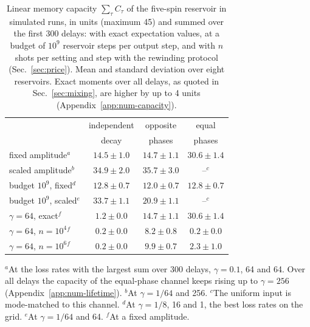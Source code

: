 \begin{table}[!t]
\caption{\label{tab:memory}Linear memory capacity $\sum_\tau C_\tau$ of the five-spin reservoir in simulated runs, in
units (maximum 45) and summed over the first 300 delays: with exact expectation values, at a budget of $10^9$
reservoir steps per output step, and with $n$ shots per setting and step with the rewinding protocol
(Sec.~\ref{sec:price}). Mean and standard deviation over eight reservoirs. Exact moments over all delays, as quoted in
Sec.~\ref{sec:mixing}, are higher by up to 4 units (Appendix~\ref{app:num-capacity}).}
\centering\footnotesize\setlength{\tabcolsep}{3pt}
\begin{tabular}{@{}lccc@{}}
\toprule
 & independent & opposite & equal\\
 & decay & phases & phases\\\midrule
fixed amplitude$^{a}$ & $14.5\pm1.0$ & $14.7\pm1.1$ & $30.6\pm1.4$\\
scaled amplitude$^{b}$ & $34.9\pm2.0$ & $35.7\pm3.0$ & --$^{c}$\\
budget $10^9$, fixed$^{d}$ & $12.8\pm0.7$ & $12.0\pm0.7$ & $12.8\pm0.7$\\
budget $10^9$, scaled$^{e}$ & $33.7\pm1.1$ & $20.9\pm1.1$ & --$^{c}$\\
$\gamma=64$, exact$^{f}$ & $1.2\pm0.0$ & $14.7\pm1.1$ & $30.6\pm1.4$\\
$\gamma=64$, $n=10^4$$^{f}$ & $0.2\pm0.0$ & $8.2\pm0.8$ & $0.2\pm0.0$\\
$\gamma=64$, $n=10^6$$^{f}$ & $0.2\pm0.0$ & $9.9\pm0.7$ & $2.3\pm1.0$\\
\bottomrule
\end{tabular}

\smallskip
\raggedright\footnotesize
$^{a}$At the loss rates with the largest sum over 300 delays, $\gamma=0.1$, 64 and 64. Over all delays the capacity of
the equal-phase channel keeps rising up to $\gamma=256$ (Appendix~\ref{app:num-lifetime}). $^{b}$At $\gamma=1/64$ and 256. $^{c}$The uniform input is mode-matched
to this channel. $^{d}$At $\gamma=1/8$, 16 and 1, the best loss rates on the grid. $^{e}$At $\gamma=1/64$ and 64.
$^{f}$At a fixed amplitude.
\end{table}

